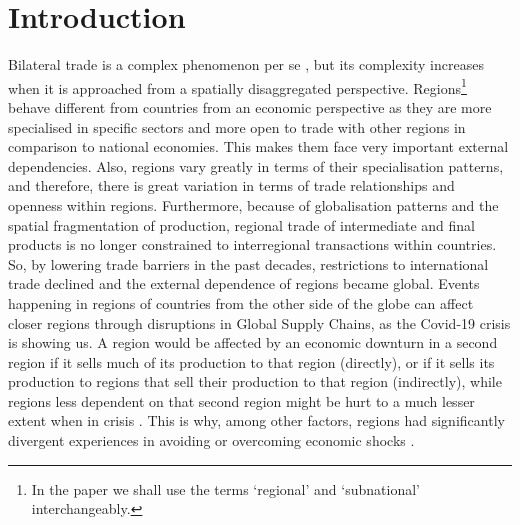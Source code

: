 \documentclass[sigconf]{acmart}
\begin{document}



\maketitle

\hypertarget{sec:1}{%
	\section{Introduction}\label{sec:1}}

Bilateral trade is a complex phenomenon per se \citep{topology_trade},
but its complexity increases when it is approached from a spatially
disaggregated perspective. Regions\footnote{In the paper we shall use
	the terms `regional' and `subnational' interchangeably.} behave
different from countries from an economic perspective as they are more
specialised in specific sectors and more open to trade with other
regions in comparison to national economies. This
makes them face very important external dependencies. Also, regions vary
greatly in terms of their specialisation patterns, and therefore, there
is great variation in terms of trade relationships and openness within
regions. Furthermore, because of globalisation patterns and the spatial
fragmentation of production, regional trade of intermediate and final
products is no longer constrained to interregional transactions within
countries. So, by lowering trade barriers in the past decades,
restrictions to international trade declined and the external dependence
of regions became global. Events happening in regions of countries from
the other side of the globe can affect closer regions through
disruptions in Global Supply Chains, as the Covid-19 crisis is showing
us. A region would be affected by an economic downturn in a second
region if it sells much of its production to that region (directly), or
if it sells its production to regions that sell their production to that
region (indirectly), while regions less dependent on that second region
might be hurt to a much lesser extent when in crisis
\citep{thissen2016competitive}. This is why, among other factors,
regions had significantly divergent experiences in avoiding or
overcoming economic shocks \citep{kitsos2019role}.
\end{document}
